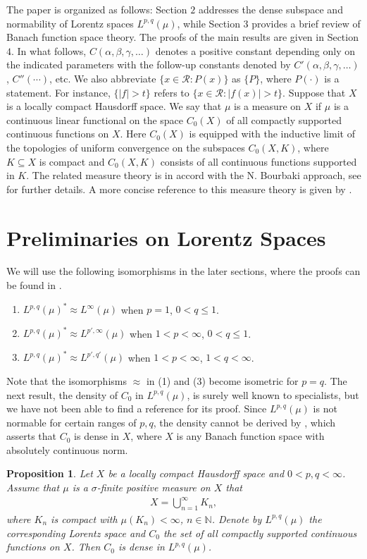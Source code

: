 \documentclass[10pt,reqno]{amsart}
\newtheorem{proposition}[theorem]{Proposition}
\numberwithin{equation}{section}
\begin{document}
The paper is organized as follows: Section $2$ addresses the dense subspace and normability of Lorentz spaces $L^{p,q}(\mu)$, while Section $3$ provides a brief review of Banach function space theory. The proofs of the main results are given in Section $4$. In what follows, $C(\alpha,\beta,\gamma,\ldots)$ denotes a positive constant depending only on the indicated parameters with the follow-up constants denoted by $C'(\alpha,\beta,\gamma,\ldots)$, $C''(\cdots)$, etc. We also abbreviate $\{x\in\mathcal{R}:P(x)\}$ as $\{P\}$, where $P(\cdot)$ is a statement. For instance, $\{|f|>t\}$ refers to $\{x\in\mathcal{R}:|f(x)|>t\}$. Suppose that $X$ is a locally compact Hausdorff space. We say that $\mu$ is a measure on $X$ if $\mu$ is a continuous linear functional on the space $C_{0}(X)$ of all compactly supported continuous functions on $X$. Here $C_{0}(X)$ is equipped with the inductive limit of the topologies of uniform convergence on the subspaces $C_{0}(X,K)$, where $K\subseteq X$ is compact and $C_{0}(X,K)$ consists of all continuous functions supported in $K$. The related measure theory is in accord with the N. Bourbaki approach, see \cite{BN} for further details. A more concise reference to this measure theory is given by \cite{DN}.

\section{Preliminaries on Lorentz Spaces}
We will use the following isomorphisms in the later sections, where the proofs can be found in \cite[Theorem 1.4.16]{GL}.
\begin{enumerate}
\item $L^{p,q}(\mu)^{\ast}\approx L^{\infty}(\mu)$ when $p=1$, $0<q\leq 1$.

\medskip
\item $L^{p,q}(\mu)^{\ast}\approx L^{p',\infty}(\mu)$ when $1<p<\infty$, $0<q\leq 1$.

\medskip
\item $L^{p,q}(\mu)^{\ast}\approx L^{p',q'}(\mu)$ when $1<p<\infty$, $1<q<\infty$.
\end{enumerate}
Note that the isomorphisms $\approx$ in (1) and (3) become isometric for $p=q$. The next result, the density of $C_{0}$ in $L^{p,q}(\mu)$, is surely well known to specialists, but we have not been able to find a reference for its proof. Since $L^{p,q}(\mu)$ is not normable for certain ranges of $p,q$, the density cannot be derived by \cite[Theorem 6.3.18]{PKJF}, which asserts that $C_{0}$ is dense in $X$, where $X$ is any Banach function space with absolutely continuous norm.
\begin{proposition}\label{lorentz dense}
Let $X$ be a locally compact Hausdorff space and $0<p,q<\infty$. Assume that $\mu$ is a $\sigma$-finite positive measure on $X$ that
\begin{align*}
X=\bigcup_{n=1}^{\infty}K_{n},
\end{align*}
where $K_{n}$ is compact with $\mu(K_{n})<\infty$, $n\in\mathbb{N}$. Denote by $L^{p,q}(\mu)$ the corresponding Lorentz space and $C_{0}$ the set of all compactly supported continuous functions on $X$. Then $C_{0}$ is dense in $L^{p,q}(\mu)$.
\end{proposition}
\end{document}
